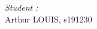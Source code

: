 \begin{titlepage}
\begin{minipage}{0.4\textwidth}
 		\begin{flushright} \large
 		\emph{Student :} \\
        Arthur LOUIS, s191230\\
      
 	\end{flushright}

 \end{minipage}\\[2 cm]


 \thedate
\end{titlepage}

\thispagestyle{empty}
\tableofcontents
\listoffigures
\listoftables
\pagebreak
\setcounter{page}{1}